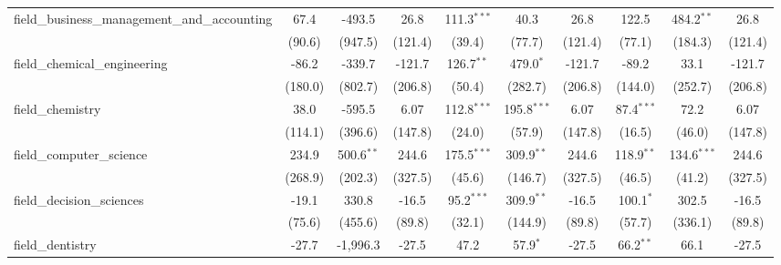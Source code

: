 \begin{tabular}{lccccccccc}
   field\_business\_management\_and\_accounting                & 67.4            & -493.5          & 26.8           & 111.3$^{***}$ & 40.3          & 26.8           & 122.5          & 484.2$^{**}$  & 26.8\\   
                                                               & (90.6)          & (947.5)         & (121.4)        & (39.4)        & (77.7)        & (121.4)        & (77.1)         & (184.3)       & (121.4)\\   
   field\_chemical\_engineering                                & -86.2           & -339.7          & -121.7         & 126.7$^{**}$  & 479.0$^{*}$   & -121.7         & -89.2          & 33.1          & -121.7\\   
                                                               & (180.0)         & (802.7)         & (206.8)        & (50.4)        & (282.7)       & (206.8)        & (144.0)        & (252.7)       & (206.8)\\   
   field\_chemistry                                            & 38.0            & -595.5          & 6.07           & 112.8$^{***}$ & 195.8$^{***}$ & 6.07           & 87.4$^{***}$   & 72.2          & 6.07\\   
                                                               & (114.1)         & (396.6)         & (147.8)        & (24.0)        & (57.9)        & (147.8)        & (16.5)         & (46.0)        & (147.8)\\   
   field\_computer\_science                                    & 234.9           & 500.6$^{**}$    & 244.6          & 175.5$^{***}$ & 309.9$^{**}$  & 244.6          & 118.9$^{**}$   & 134.6$^{***}$ & 244.6\\   
                                                               & (268.9)         & (202.3)         & (327.5)        & (45.6)        & (146.7)       & (327.5)        & (46.5)         & (41.2)        & (327.5)\\   
   field\_decision\_sciences                                   & -19.1           & 330.8           & -16.5          & 95.2$^{***}$  & 309.9$^{**}$  & -16.5          & 100.1$^{*}$    & 302.5         & -16.5\\   
                                                               & (75.6)          & (455.6)         & (89.8)         & (32.1)        & (144.9)       & (89.8)         & (57.7)         & (336.1)       & (89.8)\\   
   field\_dentistry                                            & -27.7           & -1,996.3        & -27.5          & 47.2          & 57.9$^{*}$    & -27.5          & 66.2$^{**}$    & 66.1          & -27.5\\   

\end{tabular}

